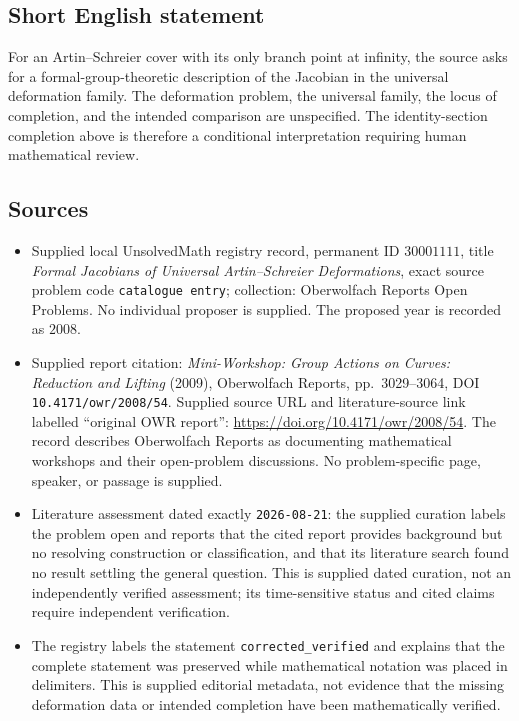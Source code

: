 \documentclass[11pt]{article}
\begin{document}
\subsection{Short English statement}
For an Artin--Schreier cover with its only branch point at infinity, the source asks for a formal-group-theoretic description of the Jacobian in the universal deformation family. The deformation problem, the universal family, the locus of completion, and the intended comparison are unspecified. The identity-section completion above is therefore a conditional interpretation requiring human mathematical review.
\subsection{Sources}
\begin{itemize}
\item Supplied local UnsolvedMath registry record, permanent ID \(30001111\), title \emph{Formal Jacobians of Universal Artin--Schreier Deformations}, exact source problem code \texttt{catalogue entry}; collection: Oberwolfach Reports Open Problems. No individual proposer is supplied. The proposed year is recorded as \(2008\).
\item Supplied report citation: \emph{Mini-Workshop: Group Actions on Curves: Reduction and Lifting} (2009), Oberwolfach Reports, pp.~3029--3064, DOI \texttt{10.4171/owr/2008/54}. Supplied source URL and literature-source link labelled ``original OWR report'': \url{https://doi.org/10.4171/owr/2008/54}. The record describes Oberwolfach Reports as documenting mathematical workshops and their open-problem discussions. No problem-specific page, speaker, or passage is supplied.
\item Literature assessment dated exactly \texttt{2026-08-21}: the supplied curation labels the problem open and reports that the cited report provides background but no resolving construction or classification, and that its literature search found no result settling the general question. This is supplied dated curation, not an independently verified assessment; its time-sensitive status and cited claims require independent verification.
\item The registry labels the statement \texttt{corrected\_verified} and explains that the complete statement was preserved while mathematical notation was placed in delimiters. This is supplied editorial metadata, not evidence that the missing deformation data or intended completion have been mathematically verified.
\end{itemize}
\end{document}
